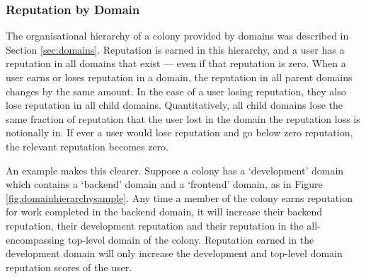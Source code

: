 



%

%
%
\subsubsection{Reputation by Domain}\label{sec:rep-by-domain}
The organisational hierarchy of a colony provided by domains was described in Section \ref{sec:domains}. Reputation is earned in this hierarchy, and a user has a reputation in all domains that exist --- even if that reputation is zero. When a user earns or loses reputation in a domain, the reputation in all parent domains changes by the same amount. In the case of a user losing reputation, they also lose reputation in all child domains. Quantitatively, all child domains lose the same fraction of reputation that the user lost in the domain the reputation loss is notionally in. If ever a user would lose reputation and go below zero reputation, the relevant reputation becomes zero.

An example makes this clearer. Suppose a colony has a `development' domain which contains a `backend' domain and a `frontend' domain, as in Figure \ref{fig:domainhierarchysample}. Any time a member of the colony earns reputation for work completed in the backend domain, it will increase their backend reputation, their development reputation and their reputation in the all-encompassing top-level domain of the colony. Reputation earned in the development domain will only increase the development and top-level domain reputation scores of the user.

